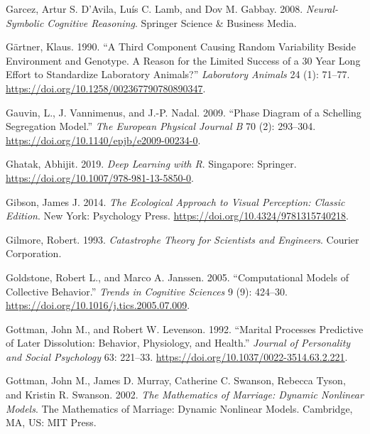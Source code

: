 \documentclass[
  a4paper,
  DIV=11,
  numbers=noendperiod,
  oneside]{scrreprt}
\newlength{\cslhangindent}
\newlength{\cslentryspacingunit} %
\newenvironment{CSLReferences}[2] %
 {%
  \setlength{\parindent}{0pt}
  \ifodd #1
  \let\oldpar\par
  \def\par{\hangindent=\cslhangindent\oldpar}
  \fi
  \setlength{\parskip}{#2\cslentryspacingunit}
 }%
 {}
\begin{document}
\begin{CSLReferences}{1}{0}
\leavevmode{}%
Garcez, Artur S. D'Avila, Luís C. Lamb, and Dov M. Gabbay. 2008.
\emph{Neural-{Symbolic Cognitive Reasoning}}. {Springer Science \&
Business Media}.

\leavevmode{}%
Gärtner, Klaus. 1990. {``A Third Component Causing Random Variability
Beside Environment and Genotype. {A} Reason for the Limited Success of a
30 Year Long Effort to Standardize Laboratory Animals?''}
\emph{Laboratory Animals} 24 (1): 71--77.
\url{https://doi.org/10.1258/002367790780890347}.

\leavevmode{}%
Gauvin, L., J. Vannimenus, and J.-P. Nadal. 2009. {``Phase Diagram of a
{Schelling} Segregation Model.''} \emph{The European Physical Journal B}
70 (2): 293--304. \url{https://doi.org/10.1140/epjb/e2009-00234-0}.

\leavevmode{}%
Ghatak, Abhijit. 2019. \emph{Deep {Learning} with {R}}. {Singapore}:
{Springer}. \url{https://doi.org/10.1007/978-981-13-5850-0}.

\leavevmode{}%
Gibson, James J. 2014. \emph{The {Ecological Approach} to {Visual
Perception}: {Classic Edition}}. {New York}: {Psychology Press}.
\url{https://doi.org/10.4324/9781315740218}.

\leavevmode{}%
Gilmore, Robert. 1993. \emph{Catastrophe {Theory} for {Scientists} and
{Engineers}}. {Courier Corporation}.

\leavevmode{}%
Goldstone, Robert L., and Marco A. Janssen. 2005. {``Computational
Models of Collective Behavior.''} \emph{Trends in Cognitive Sciences} 9
(9): 424--30. \url{https://doi.org/10.1016/j.tics.2005.07.009}.

\leavevmode{}%
Gottman, John M., and Robert W. Levenson. 1992. {``Marital Processes
Predictive of Later Dissolution: {Behavior}, Physiology, and Health.''}
\emph{Journal of Personality and Social Psychology} 63: 221--33.
\url{https://doi.org/10.1037/0022-3514.63.2.221}.

\leavevmode{}%
Gottman, John M., James D. Murray, Catherine C. Swanson, Rebecca Tyson,
and Kristin R. Swanson. 2002. \emph{The Mathematics of Marriage:
{Dynamic} Nonlinear Models}. The Mathematics of Marriage: {Dynamic}
Nonlinear Models. {Cambridge, MA, US}: {MIT Press}.


\end{CSLReferences}
\end{document}
